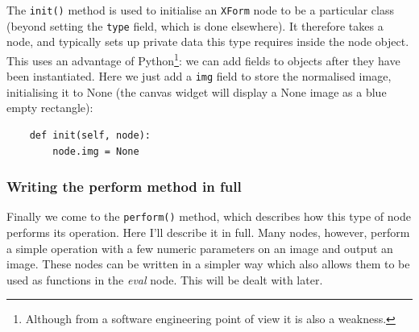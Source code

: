 The \texttt{init()} method is used to initialise an \texttt{XForm} node to be a
particular class (beyond setting the \texttt{type} field, which is done
elsewhere). It therefore takes a node, and typically sets up private data
this type requires inside the node object. This uses an advantage of
Python\footnote{Although from a software engineering point of view it is also
a weakness.}: we can add fields to objects after they have been instantiated.
Here we just add a \texttt{img} field to store the normalised image,
initialising it to None (the
canvas widget will display a None image as a blue empty rectangle):
\begin{lstlisting}
    def init(self, node):
        node.img = None
\end{lstlisting}

\subsubsection{Writing the perform method in full}
Finally we come to the \texttt{perform()} method, which describes how this
type of node performs its operation. Here I'll describe it in full. Many
nodes, however, perform a simple operation with a few numeric parameters
on an image and output an image. These nodes can be written in a 
simpler way which also allows them to be used as functions in the 
\emph{eval} node. This will be dealt with later.

